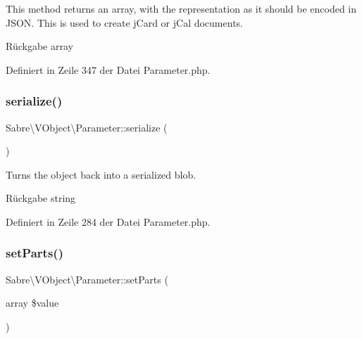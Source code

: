This method returns an array, with the representation as it should be encoded in J\+S\+ON. This is used to create j\+Card or j\+Cal documents.

\begin{DoxyReturn}{Rückgabe}
array 
\end{DoxyReturn}


Definiert in Zeile 347 der Datei Parameter.\+php.

\mbox{\label{class_sabre_1_1_v_object_1_1_parameter_a8256c846b0508fce0023186406ed1929}} 
\subsubsection{\texorpdfstring{serialize()}{serialize()}}
{\footnotesize\ttfamily Sabre\textbackslash{}\+V\+Object\textbackslash{}\+Parameter\+::serialize (\begin{DoxyParamCaption}{ }\end{DoxyParamCaption})}

Turns the object back into a serialized blob.

\begin{DoxyReturn}{Rückgabe}
string 
\end{DoxyReturn}


Definiert in Zeile 284 der Datei Parameter.\+php.

\mbox{\label{class_sabre_1_1_v_object_1_1_parameter_a4dea2cbcdaaac46f0a20bf38839a723c}} 
\subsubsection{\texorpdfstring{set\+Parts()}{setParts()}}
{\footnotesize\ttfamily Sabre\textbackslash{}\+V\+Object\textbackslash{}\+Parameter\+::set\+Parts (\begin{DoxyParamCaption}\item[{array}]{\$value }\end{DoxyParamCaption})}

